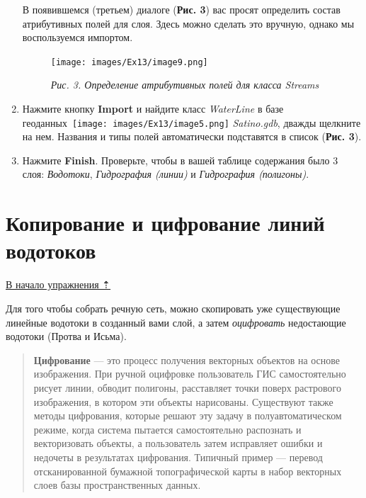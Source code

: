 \documentclass[12pt,]{book}
\begin{document}
\begin{enumerate}
  В появившемся (третьем) диалоге (\textbf{Рис. 3}) вас просят определить состав атрибутивных полей для слоя. Здесь можно сделать это вручную, однако мы воспользуемся импортом.

  \begin{figure}
  \centering
  \texttt{[image: images/Ex13/image9.png]}
  \caption{\emph{Рис. 3. Определение атрибутивных полей для класса Streams}}
  \end{figure}
\item
  Нажмите кнопку \textbf{Import} и найдите класс \emph{WaterLine} в базе геоданных~\texttt{[image: images/Ex13/image5.png]} \emph{Satino.gdb}, дважды щелкните на нем. Названия и типы полей автоматически подставятся в список (\textbf{Рис. 3}).
\item
  Нажмите \textbf{Finish}. Проверьте, чтобы в вашей таблице содержания было 3 слоя: \emph{Водотоки}, \emph{Гидрография (линии)} и \emph{Гидрография (полигоны)}.
\end{enumerate}

\hypertarget{network-hydro-digitizing}{%
\section{Копирование и цифрование линий водотоков}\label{network-hydro-digitizing}}

\protect\hyperlink{network-hydro}{В начало упражнения ⇡}

Для того чтобы собрать речную сеть, можно скопировать уже существующие линейные водотоки в созданный вами слой, а затем \emph{оцифровать} недостающие водотоки (Протва и Исьма).

\begin{quote}
\textbf{Цифрование} --- это процесс получения векторных объектов на основе изображения. При ручной оцифровке пользователь ГИС самостоятельно рисует линии, обводит полигоны, расставляет точки поверх растрового изображения, в котором эти объекты нарисованы. Существуют также методы цифрования, которые решают эту задачу в полуавтоматическом режиме, когда система пытается самостоятельно распознать и векторизовать объекты, а пользователь затем исправляет ошибки и недочеты в результатах цифрования. Типичный пример --- перевод отсканированной бумажной топографической карты в набор векторных слоев базы пространственных данных.
\end{quote}
\end{document}
